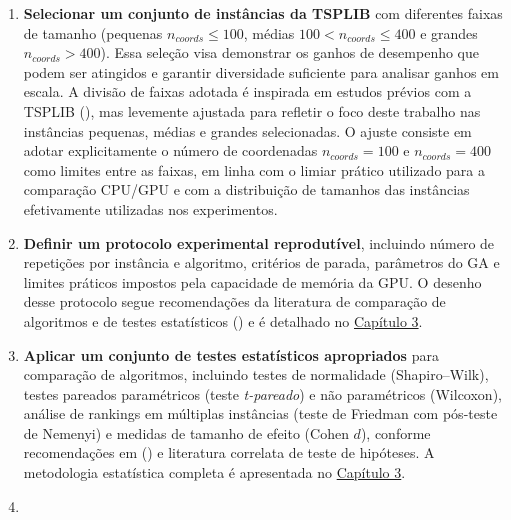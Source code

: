 \begin{enumerate}
  Os nomes utilizados aqui seguem as implementações
  \texttt{GeneticAlgorithmCPU}, \texttt{GeneticAlgorithmHybridNaive},
  \texttt{GeneticAlgorithmHybridOptimized} e
  \texttt{GeneticAlgorithmFullGPU} do framework experimental, cujos
  detalhes arquiteturais são apresentados no
  \hyperref[cap3-materiais-metodos]{Capítulo 3}.
  {[}\^{}ingenuity-disambiguation{]}: Na literatura, o termo ``naive''
  (ingênuo) é frequentemente utilizado para descrever implementações
  simples que não exploram otimizações avançadas.
\item
  \textbf{Selecionar um conjunto de instâncias da TSPLIB} com diferentes
  faixas de tamanho (pequenas \(n_{coords} \leq 100\), médias
  \(100 < n_{coords} \leq 400\) e grandes \(n_{coords} > 400\)). Essa
  seleção visa demonstrar os ganhos de desempenho que podem ser
  atingidos e garantir diversidade suficiente para analisar ganhos em
  escala. A divisão de faixas adotada é inspirada em estudos prévios com
  a TSPLIB (), mas levemente
  ajustada para refletir o foco deste trabalho nas instâncias pequenas,
  médias e grandes selecionadas. O ajuste consiste em adotar
  explicitamente o número de coordenadas \(n_{coords} = 100\) e
  \(n_{coords} = 400\) como limites entre as faixas, em linha com o
  limiar prático utilizado para a comparação CPU/GPU e com a
  distribuição de tamanhos das instâncias efetivamente utilizadas nos
  experimentos.
\item
  \textbf{Definir um protocolo experimental reprodutível}, incluindo
  número de repetições por instância e algoritmo, critérios de parada,
  parâmetros do GA e limites práticos impostos pela capacidade de
  memória da GPU. O desenho desse protocolo segue recomendações da
  literatura de comparação de algoritmos e de testes estatísticos
  () e é detalhado no
  \hyperref[cap3-materiais-metodos]{Capítulo 3}.
\item
  \textbf{Aplicar um conjunto de testes estatísticos apropriados} para
  comparação de algoritmos, incluindo testes de normalidade
  (Shapiro--Wilk), testes pareados paramétricos (teste \emph{t-pareado})
  e não paramétricos (Wilcoxon), análise de rankings em múltiplas
  instâncias (teste de Friedman com pós-teste de Nemenyi) e medidas de
  tamanho de efeito (Cohen \(d\)), conforme recomendações em
  () e literatura correlata de
  teste de hipóteses. A metodologia estatística completa é apresentada
  no \hyperref[cap3-materiais-metodos]{Capítulo 3}.
\item

\end{enumerate}
